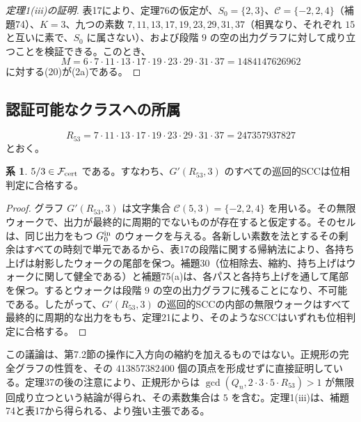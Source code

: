 \documentclass[11pt,reqno]{amsart}
\theoremstyle{definition}
\newtheorem{corollary}[theorem]{系}
\theoremstyle{definition}
\theoremstyle{remark}
\begin{document}
\begin{proof}[定理1(iii)の証明]\leavevmode\label{proof:1-iii}
表17により、定理76の仮定が、\(S_0=\{2,3\}\)、\(\mathcal C=\{-2,2,4\}\)（補題74）、\(K=3\)、九つの素数 \(7,11,13,17,19,23,29,31,37\)（相異なり、それぞれ \(15\) と互いに素で、\(S_0\) に属さない）、および段階 \(9\) の空の出力グラフに対して成り立つことを検証できる。このとき、
\[
M=6\cdot7\cdot11\cdot13\cdot17\cdot19\cdot23\cdot29\cdot31\cdot37
=1484147626962
\]
に対する(20)が(2a)である。\qedhere
\end{proof}

\subsection{認証可能なクラスへの所属}\label{sec:F.4}

\[
R_{53}=7\cdot11\cdot13\cdot17\cdot19\cdot23\cdot29\cdot31\cdot37
=247357937827
\]
とおく。

\begin{samepage}
\begin{corollary}\leavevmode\label{thm:77}
\(5/3\in\mathcal F_{\rm cert}\) である。すなわち、\(G'(R_{53},3)\) のすべての巡回的SCCは位相判定に合格する。
\label{thm-end:77}
\end{corollary}
\end{samepage}

\begin{proof}\leavevmode\label{proof:77}
グラフ \(G'(R_{53},3)\) は文字集合 \(\mathcal C(5,3)=\{-2,2,4\}\) を用いる。その無限ウォークで、出力が最終的に周期的でないものが存在すると仮定する。そのセルは、同じ出力をもつ \(G_0^{\rm in}\) のウォークを与える。各新しい素数を法とするその剰余はすべての時刻で単元であるから、表17の段階に関する帰納法により、各持ち上げは射影したウォークの尾部を保つ。補題30（位相除去、縮約、持ち上げはウォークに関して健全である）と補題75(a)は、各パスと各持ち上げを通して尾部を保つ。するとウォークは段階 \(9\) の空の出力グラフに残ることになり、不可能である。したがって、\(G'(R_{53},3)\) の巡回的SCCの内部の無限ウォークはすべて最終的に周期的な出力をもち、定理21により、そのようなSCCはいずれも位相判定に合格する。\qedhere
\end{proof}

この議論は、第7.2節の操作に入方向の縮約を加えるものではない。正規形の完全グラフの性質を、その \(413857382400\) 個の頂点を形成せずに直接証明している。定理37の後の注意により、正規形からは \(\gcd(Q_n,2\cdot3\cdot5\cdot R_{53})>1\) が無限回成り立つという結論が得られ、その素数集合は \(5\) を含む。定理1(iii)は、補題74と表17から得られる、より強い主張である。
\end{document}

